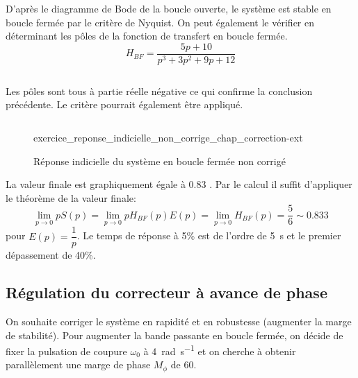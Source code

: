 D'après le diagramme de Bode de la boucle ouverte, le système est stable 
en boucle fermée par le critère de Nyquist. On peut également le vérifier 
en déterminant les pôles de la fonction de transfert en boucle fermée.
\[
    H_{BF}=\dfrac{5p+10}{p^3+3p^2+9p+12}
\]
\inputminted{scilab}{codes/scilab/code_q3_chap_correction.sce}
Les pôles sont tous à partie réelle négative ce qui confirme la conclusion 
précédente. Le critère pourrait également être appliqué.
\inputminted{scilab}{codes/scilab/code_q4_chap_correction.sce}
\begin{figure}
    \centering
    {exercice_reponse_indicielle_non_corrige_chap_correction-ext}
    
    \caption{Réponse indicielle du système en boucle fermée non corrigé}
\end{figure}
La valeur finale est graphiquement égale à 0.83 .
Par le calcul il suffit d'appliquer le théorème de la valeur finale:
\[
    \lim\limits_{p\to0} pS(p)=
    \lim\limits_{p\to0} pH_{BF}(p)E(p)=
    \lim\limits_{p\to0} H_{BF}(p)=\dfrac{5}{6}\sim0.833
\]
pour $E(p)=\dfrac{1}{p}$.
Le temps de réponse à 5\% est de l'ordre de \SI{5}{\second} et le premier 
dépassement de 40\%.
\subsection*{Régulation du correcteur à avance de phase}
On souhaite corriger le système en rapidité et en robustesse (augmenter la 
marge de stabilité). Pour augmenter la bande passante en boucle fermée, on 
décide de fixer la pulsation de coupure $\omega_0$ à 
\SI{4}{\radian\per\second} et on cherche à obtenir parallèlement une marge 
de phase $M_\phi$ de \SI{60}{\degreeSI}.

